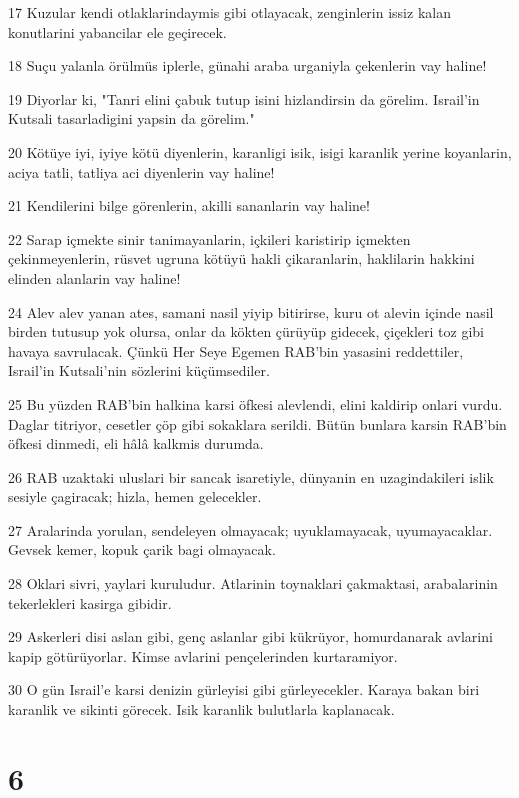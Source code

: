\par 17 Kuzular kendi otlaklarindaymis gibi otlayacak, zenginlerin issiz kalan konutlarini yabancilar ele geçirecek.
\par 18 Suçu yalanla örülmüs iplerle, günahi araba urganiyla çekenlerin vay haline!
\par 19 Diyorlar ki, "Tanri elini çabuk tutup isini hizlandirsin da görelim. Israil'in Kutsali tasarladigini yapsin da görelim."
\par 20 Kötüye iyi, iyiye kötü diyenlerin, karanligi isik, isigi karanlik yerine koyanlarin, aciya tatli, tatliya aci diyenlerin vay haline!
\par 21 Kendilerini bilge görenlerin, akilli sananlarin vay haline!
\par 22 Sarap içmekte sinir tanimayanlarin, içkileri karistirip içmekten çekinmeyenlerin, rüsvet ugruna kötüyü hakli çikaranlarin, haklilarin hakkini elinden alanlarin vay haline!
\par 24 Alev alev yanan ates, samani nasil yiyip bitirirse, kuru ot alevin içinde nasil birden tutusup yok olursa, onlar da kökten çürüyüp gidecek, çiçekleri toz gibi havaya savrulacak. Çünkü Her Seye Egemen RAB'bin yasasini reddettiler, Israil'in Kutsali'nin sözlerini küçümsediler.
\par 25 Bu yüzden RAB'bin halkina karsi öfkesi alevlendi, elini kaldirip onlari vurdu. Daglar titriyor, cesetler çöp gibi sokaklara serildi. Bütün bunlara karsin RAB'bin öfkesi dinmedi, eli hâlâ kalkmis durumda.
\par 26 RAB uzaktaki uluslari bir sancak isaretiyle, dünyanin en uzagindakileri islik sesiyle çagiracak; hizla, hemen gelecekler.
\par 27 Aralarinda yorulan, sendeleyen olmayacak; uyuklamayacak, uyumayacaklar. Gevsek kemer, kopuk çarik bagi olmayacak.
\par 28 Oklari sivri, yaylari kuruludur. Atlarinin toynaklari çakmaktasi, arabalarinin tekerlekleri kasirga gibidir.
\par 29 Askerleri disi aslan gibi, genç aslanlar gibi kükrüyor, homurdanarak avlarini kapip götürüyorlar. Kimse avlarini pençelerinden kurtaramiyor.
\par 30 O gün Israil'e karsi denizin gürleyisi gibi gürleyecekler. Karaya bakan biri karanlik ve sikinti görecek. Isik karanlik bulutlarla kaplanacak.

\chapter{6}


